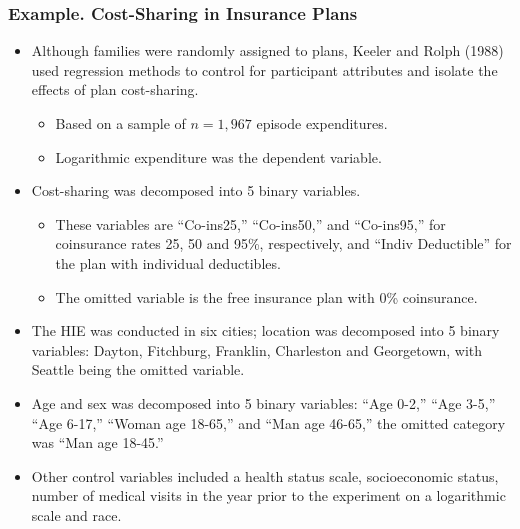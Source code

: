 \begin{frame}[shrink=10]
 \frametitle{Example. Cost-Sharing in Insurance Plans}
\begin{itemize}
\item Although families were randomly assigned to plans, Keeler and Rolph
(1988) used regression methods to control for participant attributes
and isolate the effects of plan cost-sharing.
\begin{itemize}
\item Based on a sample of $n=1,967$ episode expenditures.
\item Logarithmic expenditure was the dependent variable.
  \end{itemize}
\item Cost-sharing was decomposed into 5
binary variables.
\begin{itemize}
\item These variables are ``Co-ins25,'' ``Co-ins50,''
and ``Co-ins95,'' for coinsurance rates 25, 50 and 95\%,
respectively, and ``Indiv Deductible'' for the plan with individual
deductibles.
\item The omitted variable is the free insurance plan with
0\% coinsurance.
  \end{itemize}
\item The HIE was conducted in six cities; location was decomposed into 5
binary variables: Dayton, Fitchburg, Franklin, Charleston and
Georgetown, with Seattle being the omitted variable.
\item Age and sex was decomposed into 5
binary variables: ``Age 0-2,'' ``Age 3-5,'' ``Age 6-17,'' ``Woman
age 18-65,'' and ``Man age 46-65,'' the omitted category was ``Man
age 18-45.''
\item Other control variables included a health status
scale, socioeconomic status, number of medical visits in the year
prior to the experiment on a logarithmic scale and race.
     \end{itemize}

\end{frame}

